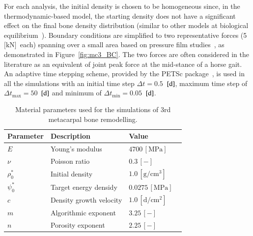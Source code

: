 \documentclass[11pt]{acmeArticle}
\numberwithin{equation}{section}
\begin{document}
For each analysis, the initial density is chosen to be homogeneous since, in the thermodynamic-based model, the starting density does not have a significant effect on the final bone density distribution (similar to other models at biological equilibrium~\citep{kuhl2003theory}). %
Boundary conditions are simplified to two representative forces (5~$\text{[kN]}$~each) spanning over a small area based on pressure film studies~\citep{Brama2001}, as demonstrated in Figure~\ref{fig:mc3_BC}. 
The two forces are often considered in the literature as an equivalent of joint peak force at the mid-stance of a horse gait. %
An adaptive time stepping scheme, provided by the PETSc package~\citep{petsc-web}, is used in all the simulations with an initial time step $\Delta t = 0.5$~$[\text d]$, maximum time step of $\Delta t_{\text {max}} = 50$~$[\text d]$ and minimum of $\Delta t_{\text {min}} = 0.05$~$[\text d]$.
\begin{table}[h]
	\centering
	\begin{tabular}{lll}
		\hline
		Parameter             & Description                  & Value  \\ \hline
		$E  $                 & Young's modulus              & $4700 \,\mathrm{ [MPa]}$ ~\citep{Les1994} \\
		$\nu  $               & Poisson ratio                & $0.3 \,\mathrm{ [-]}$ \\
		$\rho_0 ^\ast  $      & Initial density              & $1.0 \,\mathrm{[ g/cm^{3}]}$  \\
		$\psi_{0}^\ast $      & Target energy densidy        & $0.0275\,\mathrm{ [MPa]}$  ~\citep{Waffenschmidt2012}  \\
		$c$                   & Density growth velocity      & $1.0 \,\mathrm{ [d/cm^{2}]}$   \\
		$m$                   & Algorithmic exponent         & $ 3.25 \,\mathrm{ [-]}$          \\
		$n$                   & Porosity exponent            & $2.25 \,\mathrm{ [-]}$     ~\citep{Les1994}   \\ 
		\hline
	\end{tabular} 
	\caption{Material parameters used for the simulations of 3rd metacarpal bone remodelling.}
	\label{tab:parameters_mc3}
\end{table}
\end{document}
